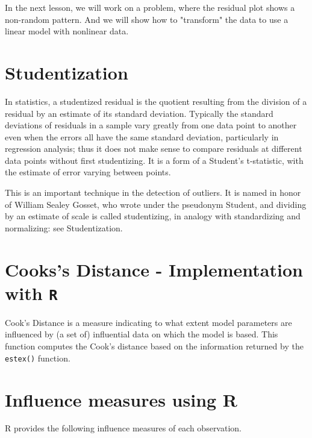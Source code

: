 \documentclass[12pt, a4paper]{report}
\theoremstyle{plain}
\theoremstyle{definition}
\theoremstyle{remark}
\begin{document}
	
	In the next lesson, we will work on a problem, where the residual plot shows a non-random pattern. And we will show how to "transform" the data to use a linear model with nonlinear data.
	
	\section{Studentization}
	In statistics, a studentized residual is the quotient resulting from the division of a residual by an estimate of its standard deviation. Typically the standard deviations of residuals in a sample vary greatly from one data point to another even when the errors all have the same standard deviation, particularly in regression analysis; thus it does not make sense to compare residuals at different data points without first studentizing. It is a form of a Student's t-statistic, with the estimate of error varying between points.
	
	This is an important technique in the detection of outliers. It is named in honor of William Sealey Gosset, who wrote under the pseudonym Student, and dividing by an estimate of scale is called studentizing, in analogy with standardizing and normalizing: see Studentization.
	
	
	
	\section{Cooks's Distance - Implementation with \texttt{R}}
	Cook's Distance is a measure indicating to what extent model parameters are influenced by (a set of) influential data on which the model is based. This function computes the Cook's distance based on the information returned by the \texttt{estex()} function.
	
	
	
	\section{Influence measures using R}
	R provides the following influence measures of each observation.
	
	
\end{document}
